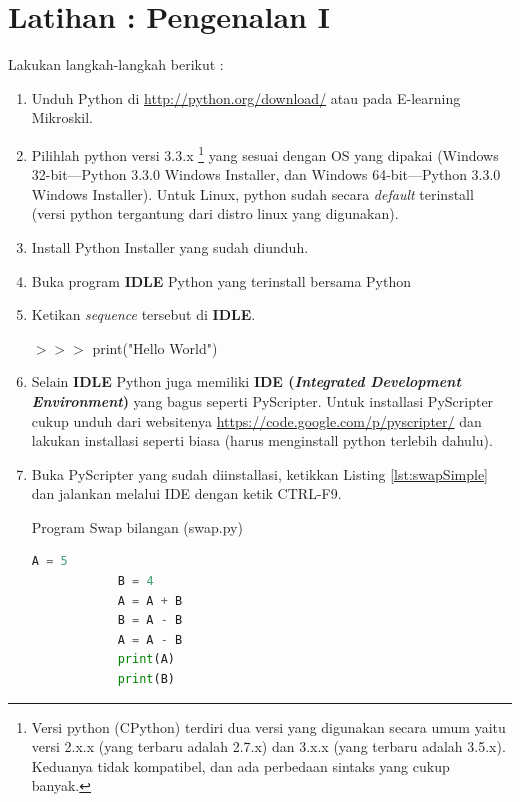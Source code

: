 \section{Latihan : Pengenalan I}

\begin{pemrograman}
Lakukan langkah-langkah berikut :
\begin{enumerate}
	\item Unduh Python di \url{http://python.org/download/} atau pada E-learning Mikroskil.
	\item Pilihlah python versi 3.3.x \footnote{Versi python (CPython) terdiri dua versi yang digunakan secara umum yaitu versi 2.x.x (yang terbaru adalah 2.7.x) dan 3.x.x (yang terbaru adalah 3.5.x). Keduanya tidak kompatibel, dan ada perbedaan sintaks yang cukup banyak.} yang sesuai dengan OS yang dipakai (Windows 32-bit---Python 3.3.0 Windows Installer, dan Windows 64-bit---Python 3.3.0 Windows Installer). Untuk Linux, python sudah secara \textit{default} terinstall (versi python tergantung dari distro linux yang digunakan).
	\item Install Python Installer yang sudah diunduh.
	\item Buka program \textbf{IDLE} Python yang terinstall bersama Python	
	\item Ketikan \textit{sequence} tersebut di \textbf{IDLE}.
	\begin{IDLE}
	\begin{tabbing}
	$>>>$ print("Hello World")
	\end{tabbing}
	\end{IDLE}
	\item Selain \textbf{IDLE} Python juga memiliki \textbf{IDE (\textit{Integrated Development Environment})} yang bagus seperti PyScripter. Untuk installasi PyScripter cukup unduh dari websitenya \url{https://code.google.com/p/pyscripter/} dan lakukan installasi seperti biasa (harus menginstall python terlebih dahulu).
	\item Buka PyScripter yang sudah diinstallasi, ketikkan Listing \ref{lst:swapSimple} dan jalankan melalui IDE  dengan ketik CTRL-F9.
		\begin{listprog}{Program Swap bilangan (swap.py)}
		\label{lst:swapSimple}
		\begin{lstlisting}[language=Python]
			A = 5
			B = 4
			A = A + B
			B = A - B
			A = A - B
			print(A)
			print(B)
		\end{lstlisting}
\end{listprog}
\end{enumerate}
\end{pemrograman}